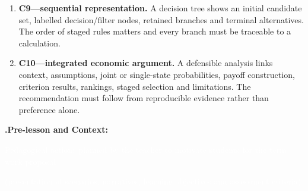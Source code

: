 \documentclass[10pt,letterpaper]{article}
\newcommand{\sectionbar}[1]{%
	\begin{tcolorbox}[
		enhanced,
		colback=sectionblue,
		colframe=sectionblue,
		boxrule=0pt,
		sharp corners,
		left=0.32in,
		right=0.08in,
		top=3.5pt,
		bottom=3.5pt,
		before skip=0pt,
		after skip=0pt,
		borderline north={1.15pt}{0pt}{black},
		borderline south={1.15pt}{0pt}{black}
		]
		\color{white}\bfseries\fontsize{12}{14}\selectfont #1
	\end{tcolorbox}%
}
\newcommand{\yellowmark}[1]{\colorbox{highlightyellow}{\strut\textcolor{white}{#1}}}
\begin{document}
\begin{bluebox}
\begin{enumerate}[leftmargin=2em,itemsep=4pt]
			\item \textbf{C9---sequential representation.} A decision tree shows an initial candidate set, labelled decision/filter nodes, retained branches and terminal alternatives. The order of staged rules matters and every branch must be traceable to a calculation.
			\item \textbf{C10---integrated economic argument.} A defensible analysis links context, assumptions, joint or single-state probabilities, payoff construction, criterion results, rankings, staged selection and limitations. The recommendation must follow from reproducible evidence rather than preference alone.
		\end{enumerate}
	\end{bluebox}
	
	\vspace{0.22in}
	
	\sectionbar{4.\quad Pre-lesson and Context:
		\yellowmark{\fontsize{10.7}{12}\selectfont Pedagogical actions planned by the teacher to motivate students for the term work proposal}\par
		\hspace*{0.49in}\yellowmark{\fontsize{10.7}{12}\selectfont (presentation of scenarios, narratives, learning objectives and assessment criteria)}}
	
\end{document}
